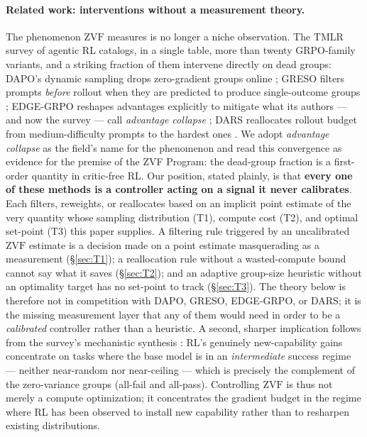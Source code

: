 \documentclass[11pt]{article}
\theoremstyle{plain}
\theoremstyle{definition}
\theoremstyle{remark}
\newcommand{\ZVF}{\ensuremath{\mathrm{ZVF}}}
\newcommand{\1}{\mathbb{1}}
\begin{document}
\paragraph{Related work: interventions without a measurement theory.}
The phenomenon \ZVF{} measures is no longer a niche observation. The TMLR
survey of agentic RL \cite{agenticrlsurvey2026} catalogs, in a single table,
more than twenty GRPO-family variants, and a striking fraction of them
intervene directly on dead groups: DAPO's dynamic sampling drops
zero-gradient groups online \cite{yu2025dapo}; GRESO filters prompts
\emph{before} rollout when they are predicted to produce single-outcome
groups \cite{greso2025}; EDGE-GRPO reshapes advantages explicitly to
mitigate what its authors --- and now the survey --- call \emph{advantage
collapse} \cite{edgegrpo2025}; DARS reallocates rollout budget from
medium-difficulty prompts to the hardest ones \cite{dars2025}. We adopt
\emph{advantage collapse} as the field's name for the phenomenon and read
this convergence as evidence for the premise of the ZVF Program: the
dead-group fraction is a first-order quantity in critic-free RL. Our
position, stated plainly, is that \textbf{every one of these methods is a
controller acting on a signal it never calibrates}. Each filters,
reweights, or reallocates based on an implicit point estimate of the very
quantity whose sampling distribution (T1), compute cost (T2), and optimal
set-point (T3) this paper supplies. A filtering rule triggered by an
uncalibrated \ZVF{} estimate is a decision made on a point estimate
masquerading as a measurement (\S\ref{sec:T1}); a reallocation rule without
a wasted-compute bound cannot say what it saves (\S\ref{sec:T2}); and an
adaptive group-size heuristic without an optimality target has no set-point
to track (\S\ref{sec:T3}). The theory below is therefore not in competition
with DAPO, GRESO, EDGE-GRPO, or DARS; it is the missing measurement layer
that any of them would need in order to be a \emph{calibrated} controller
rather than a heuristic. A second, sharper implication follows from the
survey's mechanistic synthesis \cite{agenticrlsurvey2026}: RL's genuinely
new-capability gains concentrate on tasks where the base model is in an
\emph{intermediate} success regime --- neither near-random nor near-ceiling
--- which is precisely the complement of the zero-variance groups (all-fail
and all-pass). Controlling \ZVF{} is thus not merely a compute optimization;
it concentrates the gradient budget in the regime where RL has been observed
to install new capability rather than to resharpen existing distributions.
\end{document}
